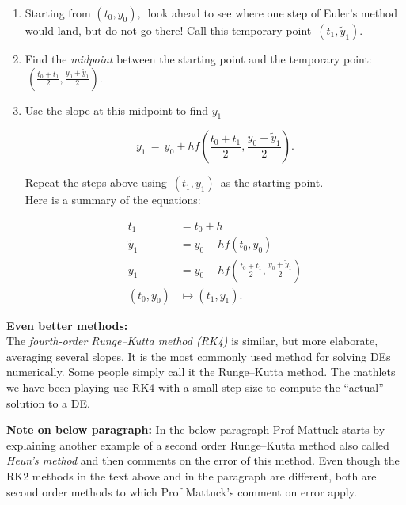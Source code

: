 \begin{enumerate}
\item Starting from $(t_0,y_0),\,$ look ahead to see where one step
  of Euler's method would land, but do not go there!
  Call this temporary point $\, (t_1,\tilde{y}_1).$
\item Find the \emph{midpoint} between the starting point and the temporary point:
  $\, \left( \frac{t_0+t_1}{2}, \frac{y_0+\tilde{y}_1}{2} \right).$
\item Use the slope at this midpoint to find $y_1$

  \begin{equation*}
    y_1\, =\,  y_0 +h f\left( \frac{t_0+t_1}{2}, \frac{y_0+\tilde{y}_1}{2} \right).
  \end{equation*}

  Repeat the steps above using $\, (t_1,y_1)\,$ as the starting point.\\
  Here is a summary of the equations: 

  \begin{align*}
    t_1 &= t_0 + h \\
    \tilde{y}_1 &= y_0+h f(t_0,y_0) \\
    y_1 &= y_0+ h f\left(\frac{t_0+t_1}{2},\frac{y_0+\tilde{y}_1}{2}\right) \\
    \left(t_0, y_0 \right) & \mapsto \left(t_1, y_1\right).
  \end{align*}

\end{enumerate}

\textbf{\color{blue} Even better methods:}\\

The \emph{\color{blue}fourth-order Runge–Kutta method (RK4)} is similar,
but more elaborate, averaging several slopes.
It is the most commonly used method for solving DEs numerically.
Some people simply call it the Runge–Kutta method.
The mathlets we have been playing use RK4 with a small step size to compute the ``actual'' solution to a DE.

\textbf{\color{orange} Note on below paragraph:}
In the below paragraph Prof Mattuck starts by explaining another example of
a second order Runge–Kutta method also called \emph{\color{blue}Heun's method} and
then comments on the error of this method.
Even though the RK2 methods in the text above and in the paragraph are different,
both are second order methods to which Prof Mattuck's comment on error apply.

